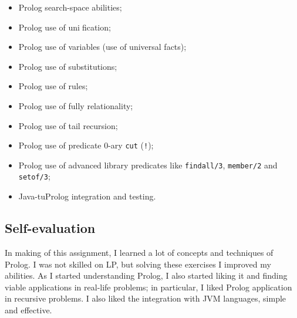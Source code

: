         \begin{itemize}
            \item Prolog search-space abilities;
            \item Prolog use of unification;
            \item Prolog use of variables (use of universal facts);
            \item Prolog use of substitutions;
            \item Prolog use of rules;
            \item Prolog use of fully relationality;
            \item Prolog use of tail recursion;
            \item Prolog use of predicate 0-ary \texttt{cut} (\texttt{!});
            \item Prolog use of advanced library predicates like \texttt{findall/3}, \texttt{member/2} and \texttt{setof/3};
            \item Java-tuProlog integration and testing.
        \end{itemize}

    \subsection*{Self-evaluation}
        In making of this assignment, I learned a lot of concepts and techniques of Prolog. 
        I was not skilled on LP, but solving these exercises I improved my abilities. 
        As I started understanding Prolog, I also started liking it and finding viable applications in real-life problems;
        in particular, I liked Prolog application in recursive problems.
        I also liked the integration with JVM languages, simple and effective.
 

    
    
